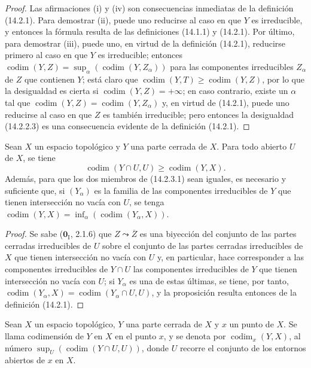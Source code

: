 \begin{proof}
Las afirmaciones (i) y (iv) son consecuencias inmediatas de la definición
(14.2.1). Para demostrar (ii), puede uno reducirse al caso en que $Y$ es
irreducible, y entonces la fórmula resulta de las definiciones (14.1.1) y
(14.2.1). Por último, para demostrar (iii), puede uno, en virtud de la
definición (14.2.1), reducirse primero al caso en que $Y$ es irreducible;
entonces $\operatorname{codim}(Y,Z)=
\sup_\alpha(\operatorname{codim}(Y,Z_\alpha))$ para las componentes
irreducibles $Z_\alpha$ de $Z$ que contienen $Y$; está claro que
$\operatorname{codim}(Y,T)\geq\operatorname{codim}(Y,Z)$, por lo que la
desigualdad es cierta si $\operatorname{codim}(Y,Z)=+\infty$; en caso
contrario, existe un $\alpha$ tal que
$\operatorname{codim}(Y,Z)=\operatorname{codim}(Y,Z_\alpha)$ y, en virtud de
(14.2.1), puede uno reducirse al caso en que $Z$ es también irreducible; pero
entonces la desigualdad (14.2.2.3) es una consecuencia evidente de la
definición (14.2.1).
\end{proof}

\begin{proposition}[14.2.3]
\label{0.14.2.3-es}
Sean $X$ un espacio topológico y $Y$ una parte cerrada de $X$. Para todo
abierto $U$ de $X$, se tiene
\[
  \operatorname{codim}(Y\cap U,U)\geq\operatorname{codim}(Y,X).
  \tag{14.2.3.1}\label{0.14.2.3.1-es}
\]
Además, para que los dos miembros de \textup{(14.2.3.1)} sean iguales, es necesario y
suficiente que, si $(Y_\alpha)$ es la familia de las componentes irreducibles
de $Y$ que tienen intersección no vacía con $U$, se tenga
$\operatorname{codim}(Y,X)=
\inf_\alpha(\operatorname{codim}(Y_\alpha,X))$.
\end{proposition}

\begin{proof}
Se sabe ($\mathbf 0_{\mathrm I}$, 2.1.6) que $Z\leadsto\overline Z$ es una biyección
del conjunto de las partes cerradas irreducibles de $U$ sobre el conjunto de
las partes cerradas irreducibles de $X$ que tienen intersección no vacía con
$U$ y, en particular, hace corresponder a las componentes irreducibles de
$Y\cap U$ las componentes irreducibles de $Y$ que tienen intersección no vacía
con $U$; si $Y_\alpha$ es una de estas últimas,
se tiene, por tanto,
$\operatorname{codim}(Y_\alpha,X)=
\operatorname{codim}(Y_\alpha\cap U,U)$, y la proposición resulta entonces de
la definición (14.2.1).
\end{proof}

\begin{definition}[14.2.4]
\label{0.14.2.4-es}
Sean $X$ un espacio topológico, $Y$ una parte cerrada de $X$ y $x$ un punto de
$X$. Se llama codimensión de $Y$ en $X$ en el punto $x$, y se denota
por $\operatorname{codim}_x(Y,X)$, al número
$\sup_U(\operatorname{codim}(Y\cap U,U))$, donde $U$ recorre el conjunto de
los entornos abiertos de $x$ en $X$.
\end{definition}

